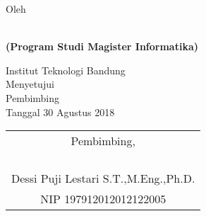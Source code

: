 \clearpage
\pagestyle{empty}

\begin{center}
\smallskip

    \singlespacing
    \large \bfseries \MakeUppercase{\thetitle}
    \vfill

    \normalsize \normalfont Oleh

    \bfseries \large \theauthor\\
    \normalsize (Program Studi Magister Informatika)

    \normalsize \normalfont Institut Teknologi Bandung \\

    \vfill
    \normalsize \normalfont
    Menyetujui\\
    Pembimbing\\
    \bigskip
    Tanggal 30 Agustus 2018

    \vfill
    \setlength{\tabcolsep}{12pt}
    \begin{tabular}{c}
        Pembimbing, \\
        \\
        \\
        \\
        \\
        Dessi Puji Lestari S.T.,M.Eng.,Ph.D. \\
        NIP 197912012012122005 \\
    \end{tabular}

\end{center}
\clearpage

